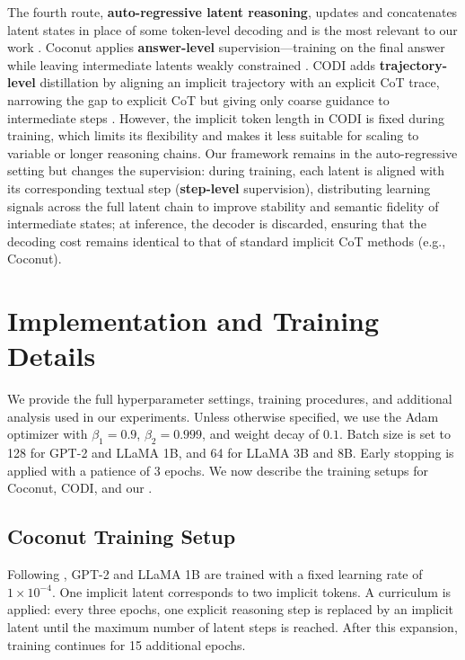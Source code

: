 The fourth route, \textbf{auto-regressive latent reasoning}, updates and concatenates latent states in place of some token-level decoding and is the most relevant to our work \citep{xu2025softcot,tan2025colar}. Coconut applies \textbf{answer-level} supervision—training on the final answer while leaving intermediate latents weakly constrained \citep{hao2024coconut}. CODI adds \textbf{trajectory-level} distillation by aligning an implicit trajectory with an explicit CoT trace, narrowing the gap to explicit CoT but giving only coarse guidance to intermediate steps \citep{shen2025codi}. However, the implicit token length in CODI is fixed during training, which limits its flexibility and makes it less suitable for scaling to variable or longer reasoning chains.
Our framework remains in the auto-regressive setting but changes the supervision: during training, each latent is aligned with its corresponding textual step (\textbf{step-level} supervision), distributing learning signals across the full latent chain to improve stability and semantic fidelity of intermediate states; at inference, the decoder is discarded, ensuring that the decoding cost remains identical to that of standard implicit CoT methods (e.g., Coconut).

\section{Implementation and Training Details}
\label{appendix:implementation}

We provide the full hyperparameter settings, training procedures, and additional analysis used in our experiments. Unless otherwise specified, we use the Adam optimizer with $\beta_1=0.9$, $\beta_2=0.999$, and weight decay of $0.1$. Batch size is set to 128 for GPT-2 and LLaMA 1B, and 64 for LLaMA 3B and 8B. Early stopping is applied with a patience of 3 epochs. We now describe the training setups for Coconut, CODI, and our \methodname.

\subsection{Coconut Training Setup}
Following \citet{hao2024coconut}, GPT-2 and LLaMA 1B \citep{Radford2019LanguageMA,llama3.2} are trained with a fixed learning rate of $1 \times 10^{-4}$. One implicit latent corresponds to two implicit tokens. A curriculum is applied: every three epochs, one explicit reasoning step is replaced by an implicit latent until the maximum number of latent steps is reached. After this expansion, training continues for 15 additional epochs.

